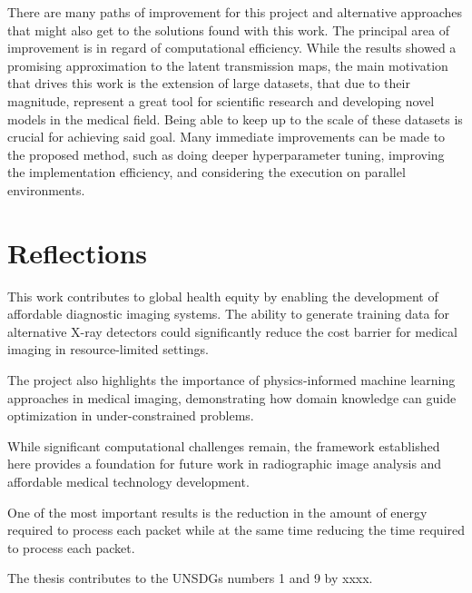 \documentclass[nomenclature, english, bibtex]{kththesis}
\numberwithin{listing}{chapter}
\begin{document}
There are many paths of improvement for this project and alternative approaches that might also get to the solutions
found with this work. The principal area of improvement is in regard of computational efficiency. While the results showed
a promising approximation to the latent transmission maps, the main motivation that drives this work is the extension of
large datasets, that due to their magnitude, represent a great tool for scientific research and developing novel models
in the medical field. Being able to keep up to the scale of these datasets is crucial for achieving said goal.
Many immediate improvements can be made to the proposed method, such as doing deeper hyperparameter tuning, improving
the implementation efficiency, and considering the execution on parallel environments.



\section{Reflections}
\label{sec:reflections}

This work contributes to global health equity by enabling the development of affordable diagnostic imaging systems. The ability to generate training data for alternative X-ray detectors could significantly reduce the cost barrier for medical imaging in resource-limited settings.

The project also highlights the importance of physics-informed machine learning approaches in medical imaging, demonstrating how domain knowledge can guide optimization in under-constrained problems.

While significant computational challenges remain, the framework established here provides a foundation for future work in radiographic image analysis and affordable medical technology development.


One of the most important results is the reduction in the amount of
energy required to process each packet while at the same time reducing the
time required to process each packet.

The thesis contributes to the \gls{UN}\enspace\glspl{SDG} numbers 1 and 9 by
xxxx.



\cleardoublepage
\renewcommand{\bibname}{References}


\ifbiblatex
    \printbibliography[heading=bibintoc]
\else
    
\fi
\end{document}
